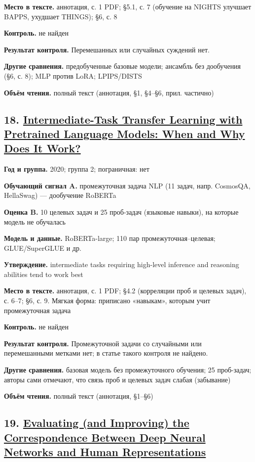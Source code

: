 \textbf{Место в тексте.} аннотация, с. 1 PDF; §5.1, с. 7 (обучение на NIGHTS улучшает BAPPS, ухудшает THINGS); §6, с. 8

\textbf{Контроль.} не найден

\textbf{Результат контроля.} Перемешанных или случайных суждений нет.

\textbf{Другие сравнения.} предобученные базовые модели; ансамбль без дообучения (§6, с. 8); MLP против LoRA; LPIPS/DISTS

\textbf{Объём чтения.} полный текст (аннотация, §1, §4–§6, прил. частично)


\subsection*{18. \href{https://doi.org/10.18653/v1/2020.acl-main.467}{Intermediate-Task Transfer Learning with Pretrained Language Models: When and Why Does It Work?}}

\textbf{Год и группа.} 2020; группа 2; пограничная: нет

\textbf{Обучающий сигнал A.} промежуточная задача NLP (11 задач, напр. CosmosQA, HellaSwag) — дообучение RoBERTa

\textbf{Оценка B.} 10 целевых задач и 25 проб-задач (языковые навыки), на которые модель не обучалась

\textbf{Модель и данные.} RoBERTa-large; 110 пар промежуточная–целевая; GLUE/SuperGLUE и др.

\textbf{Утверждение.} intermediate tasks requiring high-level inference and reasoning abilities tend to work best

\textbf{Место в тексте.} аннотация, с. 1 PDF; §4.2 (корреляции проб и целевых задач), с. 6–7; §6, с. 9. Мягкая форма: приписано «навыкам», которым учит промежуточная задача

\textbf{Контроль.} не найден

\textbf{Результат контроля.} Промежуточной задачи со случайными или перемешанными метками нет; в статье такого контроля не найдено.

\textbf{Другие сравнения.} базовая модель без промежуточного обучения; 25 проб-задач; авторы сами отмечают, что связь проб и целевых задач слабая (забывание)

\textbf{Объём чтения.} полный текст (аннотация, §1–§6)


\subsection*{19. \href{https://doi.org/10.1111/cogs.12670}{Evaluating (and Improving) the Correspondence Between Deep Neural Networks and Human Representations}}

